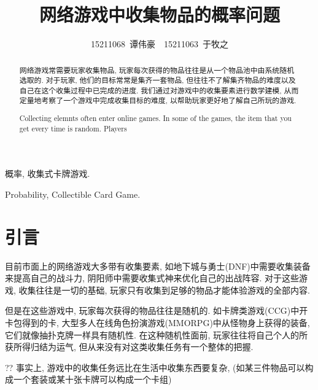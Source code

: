\documentclass[10pt,journal,compsoc]{IEEEtran}
\begin{document}
\title{网络游戏中收集物品的概率问题}

\author{15211068~谭伟豪~~15211063~于牧之}

\maketitle

\newtheorem{definition}{Definition}
\renewcommand{\abstractname}{摘 要}
\renewcommand{\figurename}{图}
\renewcommand{\tablename}{表}
\renewcommand{\IEEEkeywordsname}{关键词}
\begin{abstract}

  网络游戏常需要玩家收集物品, 玩家每次获得的物品往往是从一个物品池中由系统随机选取的. 对于玩家, 他们的目标常常是集齐一套物品, 但往往不了解集齐物品的难度以及自己在这个收集过程中已完成的进度. 我们通过对游戏中的收集要素进行数学建模, 从而定量地考察了一个游戏中完成收集目标的难度, 以帮助玩家更好地了解自己所玩的游戏.

\end{abstract}
\renewcommand{\abstractname}{Abstract}
\begin{abstract}
  Collecting elemnts often enter online games. In some of the games, the item that you get every time is random. Players 
\end{abstract}

\begin{IEEEkeywords}
概率, 收集式卡牌游戏.
\end{IEEEkeywords}
\renewcommand{\IEEEkeywordsname}{Keywords}
\begin{IEEEkeywords}
Probability, Collectible Card Game.
\end{IEEEkeywords}

\section{引言}

  目前市面上的网络游戏大多带有收集要素, 如地下城与勇士(DNF)中需要收集装备来提高自己的战斗力, 阴阳师中需要收集式神来优化自己的出战阵容. 对于这些游戏, 收集往往是一切的基础, 玩家只有收集到足够的物品才能体验游戏的全部内容.

  但是在这些游戏中, 玩家每次获得的物品往往是随机的. 如卡牌类游戏(CCG)中开卡包得到的卡, 大型多人在线角色扮演游戏(MMORPG)中从怪物身上获得的装备, 它们就像抽扑克牌一样具有随机性. 在这种随机性面前, 玩家往往将自己个人的所获所得归结为运气, 但从来没有对这类收集任务有一个整体的把握.

  ?? 事实上, 游戏中的收集任务远比在生活中收集东西要复杂, (如某三件物品可以构成一个套装或某十张卡牌可以构成一个卡组)
\end{document}
